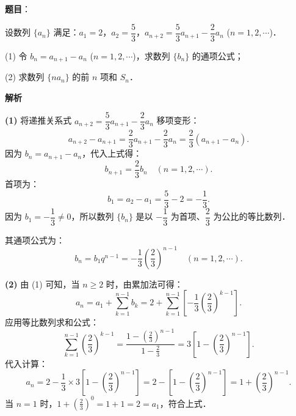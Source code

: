 \begin{answer}

\textbf{题目}：

设数列 $\{a_n\}$ 满足：$a_1 = 2$，$a_2 = \dfrac{5}{3}$，$a_{n+2} = \dfrac{5}{3}a_{n+1} - \dfrac{2}{3}a_n$ ($n = 1, 2, \cdots$)．

(1) 令 $b_n = a_{n+1} - a_n$ ($n = 1, 2, \cdots$)，求数列 $\{b_n\}$ 的通项公式；

(2) 求数列 $\{n a_n\}$ 的前 $n$ 项和 $S_n$．

\textbf{解析}

\textbf{(1)}
将递推关系式 $a_{n+2} = \dfrac{5}{3}a_{n+1} - \dfrac{2}{3}a_n$ 移项变形：
\nopagebreak[4]
\[
a_{n+2} - a_{n+1} = \frac{2}{3}a_{n+1} - \frac{2}{3}a_n = \frac{2}{3}(a_{n+1} - a_n).
\]
因为 $b_n = a_{n+1} - a_n$，代入上式得：
\nopagebreak[4]
\[
b_{n+1} = \frac{2}{3}b_n \quad (n = 1, 2, \cdots).
\]
首项为：
\nopagebreak[4]
\[
b_1 = a_2 - a_1 = \frac{5}{3} - 2 = -\frac{1}{3}.
\]
因为 $b_1 = -\dfrac{1}{3} \neq 0$，所以数列 $\{b_n\}$ 是以 $-\dfrac{1}{3}$ 为首项、$\dfrac{2}{3}$ 为公比的等比数列．

其通项公式为：
\nopagebreak[4]
\[
b_n = b_1 q^{n-1} = -\frac{1}{3}\left(\frac{2}{3}\right)^{n-1} \quad (n = 1, 2, \cdots).
\]

\textbf{(2)}
由 (1) 可知，当 $n \geqslant 2$ 时，由累加法可得：
\nopagebreak[4]
\[
a_n = a_1 + \sum_{k=1}^{n-1} b_k = 2 + \sum_{k=1}^{n-1} \left[-\frac{1}{3}\left(\frac{2}{3}\right)^{k-1}\right].
\]
应用等比数列求和公式：
\nopagebreak[4]
\[
\sum_{k=1}^{n-1} \left(\frac{2}{3}\right)^{k-1} = \frac{1 - \left(\frac{2}{3}\right)^{n-1}}{1 - \frac{2}{3}} = 3\left[1 - \left(\frac{2}{3}\right)^{n-1}\right].
\]
代入计算：
\nopagebreak[4]
\[
a_n = 2 - \frac{1}{3} \times 3\left[1 - \left(\frac{2}{3}\right)^{n-1}\right] = 2 - \left[1 - \left(\frac{2}{3}\right)^{n-1}\right] = 1 + \left(\frac{2}{3}\right)^{n-1}.
\]
当 $n = 1$ 时，$1 + \left(\frac{2}{3}\right)^0 = 1 + 1 = 2 = a_1$，符合上式．


\end{answer}
